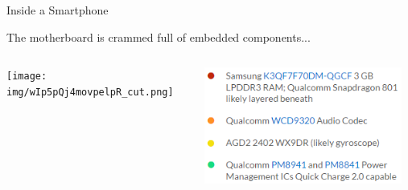 \documentclass[aspectratio=169]{beamer}
\begin{document}
	\begin{frame}{Inside a Smartphone}
		\begin{flushleft}The motherboard is crammed full of embedded components...\end{flushleft}
		\begin{columns}
		\begin{column}{0.55\textwidth}	
		\centering
		\texttt{[image: img/wIp5pQj4movpelpR\_cut.png]}	
		\end{column}
		\begin{column}{0.45\textwidth}
		\centering		
		\includegraphics[width=0.95\textwidth,height=0.75\textheight,keepaspectratio]{img/oneplus_1.png}
		\end{column}
		\end{columns}
	\end{frame}  
\end{document}
